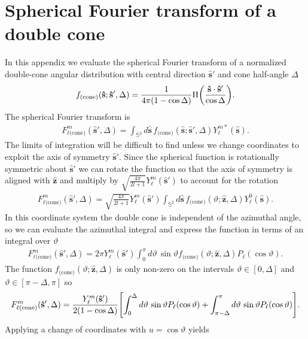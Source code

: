 \documentclass[]{osa-article}
\let\originalleft\left
\let\originalright\right
\renewcommand{\left}{\mathopen{}\mathclose\bgroup\originalleft}
\renewcommand{\right}{\aftergroup\egroup\originalright}
\providecommand{\mh}[1]{\mathbf{\hat{#1}}}
\providecommand{\mbb}[1]{\mathbb{#1}}
\begin{document}
\section{Spherical Fourier transform of a double cone}\label{sec:cone}
In this appendix we evaluate the spherical Fourier transform of a
normalized double-cone angular distribution with central direction $\mh{s}'$ and
cone half-angle $\Delta$
\begin{align}
  f_{\text{(cone)}}(\mh{s}; \mh{s}', \Delta) = \frac{1}{4\pi(1 - \cos\Delta)}\Pi\left(\frac{\mh{s}\cdot\mh{s}'}{\cos\Delta}\right). 
\end{align}
The spherical Fourier transform is
\begin{align}
  F_{\ell\text{(cone)}}^m(\mh{s}', \Delta) = \int_{\mbb{S}^2}d\mh{s}\, f_{\text{(cone)}}(\mh{s}; \mh{s}', \Delta)Y_\ell^{m*}(\mh{s}).
\end{align}
The limits of integration will be difficult to find unless we change coordinates
to exploit the axis of symmetry $\mh{s}'$. Since the spherical function is
rotationally symmetric about $\mh{s}'$ we can rotate the function so that the axis of
symmetry is aligned with $\mh{z}$ and multiply by $\sqrt{\frac{4\pi}{2l+1}}Y_\ell^m(\mh{s}')$ to account for the rotation \cite{ramamoorthi2005}
\begin{align}
    F_{\ell\text{(cone)}}^m(\mh{s}', \Delta) = \sqrt{\frac{4\pi}{2l+1}}Y_\ell^m(\mh{s}')\int_{\mbb{S}^2}d\mh{s}\, f_{\text{(cone)}}(\vartheta; \mh{z}, \Delta)Y_\ell^0(\mh{s}). 
\end{align}
In this coordinate system the double cone is independent of the azimuthal angle,
so we can evaluate the azimuthal integral and express the function in terms of an
integral over
$\vartheta$
\begin{align}
    F_{\ell\text{(cone)}}^m(\mh{s}', \Delta) = 2\pi Y_\ell^m(\mh{s}')\int_{0}^\pi d\vartheta\, \sin\vartheta f_{\text{(cone)}}(\vartheta; \mh{z}, \Delta)P_\ell(\cos\vartheta). 
\end{align}
The function $f_{\text{(cone)}}(\vartheta; \mh{z}, \Delta)$ is only non-zero on
the intervals $\vartheta \in [0, \Delta]$ and
$\vartheta \in [\pi - \Delta, \pi]$ so
\begin{align}
    F_{\ell\text{(cone)}}^m(\mh{s}', \Delta) = \frac{Y_\ell^m(\mh{s}')}{2(1 - \cos\Delta)}\left[\int_{0}^\Delta d\vartheta\, \sin\vartheta P_\ell(\cos\vartheta) + \int_{\pi - \Delta}^\pi d\vartheta\, \sin\vartheta P_\ell(\cos\vartheta)\right]. 
\end{align}
Applying a change of coordinates with $u = \cos\vartheta$ yields
\end{document}
